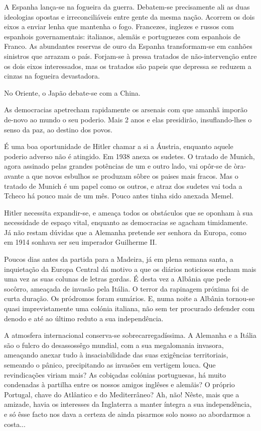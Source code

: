 \documentclass[9pt]{article}
\begin{document}
A Espanha lan\-ça-se na fogueira da guerra. Debatem-se precisamente ali
as duas ideologias opostas e irreconciliáveis entre gente da mesma na\-ção. Acorrem os dois eixos a enviar lenha que mantenha o fogo. Francezes, inglezes e
russos com espanhois governamentais: italianos, alemãis e portuguezes com
espanhois de Franco. As abundantes reservas de ouro da Espanha transformam-se em canhões sinistros que arrazam o país. Forjam-se à pressa tratados de
não-interven\-ção entre os dois eixos interessados, mas os tratados são papeis
que depressa se reduzem a cinzas na fogueira devastadora.

No Oriente, o Japão debate-se com a China.

As democracias apetrecham rapidamente os arsenais com que a\-ma\-nhã imporão de-novo ao mundo o seu poderio. Mais 2 anos e elas presidirão, insuflando-\-lhes o senso da paz, ao destino dos povos.

É uma boa oportunidade de Hitler chamar a si a Áustria, enquanto aquele
poderio adverso não é atingido. Em 1938 anexa os sudetes. O tratado de
Munich, agora assinado pelas gran\-des potências de um e outro lado, vai opôr-se de òra-avante a que novos esbu\-lhos se produzam sôbre os paises mais fracos. Mas o tratado de Munich é um papel como os outros, e atraz dos sudetes
vai toda a Tcheco há pouco mais de um mês. Pouco antes tinha sido anexada
Memel.

Hitler necessita expandir-se, e ameaça todos os obstáculos que se oponham à sua necessidade de espaço vital, enquanto as democracias se agacham
timidamente. Já não restam dúvidas que a Alemanha pretende ser senhora da
Europa, como em 1914 sonhava ser seu imperador Gui\-lherme II.

Poucos dias antes da partida para a Madeira, já em plena semana santa,
a inquieta\-ção da Europa Central dá motivo a que os diários noticiosos encham mais uma vez as suas colunas de letras gordas. É desta vez a Albânia
que pede socôrro, ameaçada de invasão pela Itália. O terror da rapinagem
próxima foi de curta dura\-ção. Os pródromos foram sumários. E, numa noite
a Albânia tornou-se quasi imprevistamente uma colónia italiana, não sem ter
procurado defender com denodo e até ao último reduto a sua independên\-cia.

A atmosfera interna\-cio\-nal conserva-se sobrecarregadíssima. A Alemanha
e a Itália são o fulcro do desassossêgo mundial, com a sua megalomania invasora, ameaçando anexar tudo à insaciabilidade das suas exi\-gên\-cias territoriais, semeando o pânico, precipitando as invasões em vertigem louca. Que
revindica\-ções viriam mais? As cobiçadas colónias portuguesas, há muito condenadas à parti\-lha entre os nossos amigos inglêses e alemãis? O próprio
Portugal, chave do Atlântico e do Mediterrâneo? Ah, não! Nêste, mais que a
amizade, havia os interesses da Inglaterra a manter íntegra a sua independên\-cia, e só êsse facto nos dava a certeza de ainda pisarmos solo nosso ao
abordarmos a costa...
\end{document}
